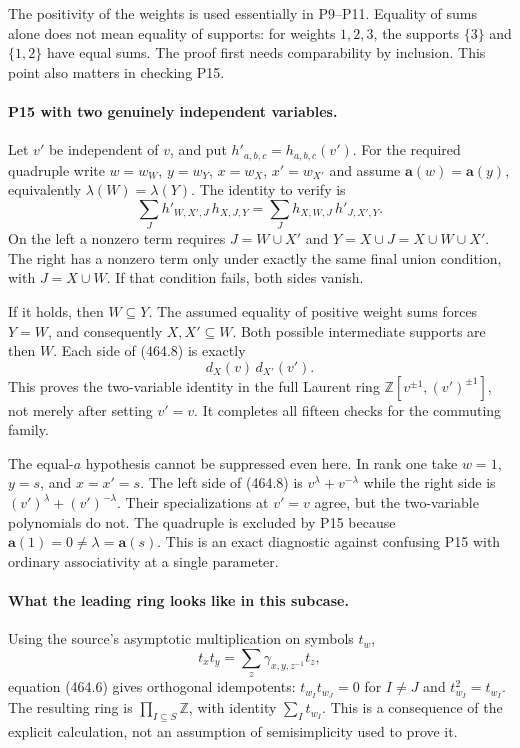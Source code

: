 \documentclass[11pt]{article}
\begin{document}
The positivity of the weights is used essentially in P9--P11.
Equality of sums alone does not mean equality of supports: for weights
$1,2,3$, the supports $\{3\}$ and $\{1,2\}$ have equal sums.
The proof first needs comparability by inclusion. This point also
matters in checking P15.

\paragraph{P15 with two genuinely independent variables.}
Let $v'$ be independent of $v$, and put
$h'_{a,b,c}=h_{a,b,c}(v')$. For the required quadruple write
$w=w_W$, $y=w_Y$, $x=w_X$, $x'=w_{X'}$ and assume
$\mathbf a(w)=\mathbf a(y)$, equivalently $\lambda(W)=\lambda(Y)$.
The identity to verify is
\[
 \sum_{J}h'_{W,X',J}\,h_{X,J,Y}
 =\sum_{J}h_{X,W,J}\,h'_{J,X',Y}.
 \tag{464.8}
\]
On the left a nonzero term requires $J=W\cup X'$ and
$Y=X\cup J=X\cup W\cup X'$. The right has a nonzero term
only under exactly the same final union condition, with
$J=X\cup W$. If that condition fails, both sides vanish.

If it holds, then $W\subseteq Y$. The assumed equality of positive
weight sums forces $Y=W$, and consequently $X,X'\subseteq W$.
Both possible intermediate supports are then $W$. Each side of
(464.8) is exactly
\[
 d_X(v)\,d_{X'}(v').
\]
This proves the two-variable identity in the full Laurent ring
$\mathbb Z[v^{\pm1},(v')^{\pm1}]$, not merely after setting
$v'=v$. It completes all fifteen checks for the commuting family.

The equal-$a$ hypothesis cannot be suppressed even here. In rank one
take $w=1$, $y=s$, and $x=x'=s$. The left side of (464.8) is
$v^{\lambda}+v^{-\lambda}$ while the right side is
$(v')^{\lambda}+(v')^{-\lambda}$. Their specializations at $v'=v$
agree, but the two-variable polynomials do not. The quadruple is
excluded by P15 because $\mathbf a(1)=0\ne\lambda=\mathbf a(s)$.
This is an exact diagnostic against confusing P15 with ordinary
associativity at a single parameter.

\paragraph{What the leading ring looks like in this subcase.}
Using the source's asymptotic multiplication on symbols $t_w$,
\[
 t_xt_y=\sum_z\gamma_{x,y,z^{-1}}t_z,
\]
equation (464.6) gives orthogonal idempotents:
$t_{w_I}t_{w_J}=0$ for $I\ne J$ and $t_{w_I}^2=t_{w_I}$.
The resulting ring is $\prod_{I\subseteq S}\mathbb Z$, with identity
$\sum_I t_{w_I}$. This is a consequence of the explicit calculation,
not an assumption of semisimplicity used to prove it.
\end{document}
